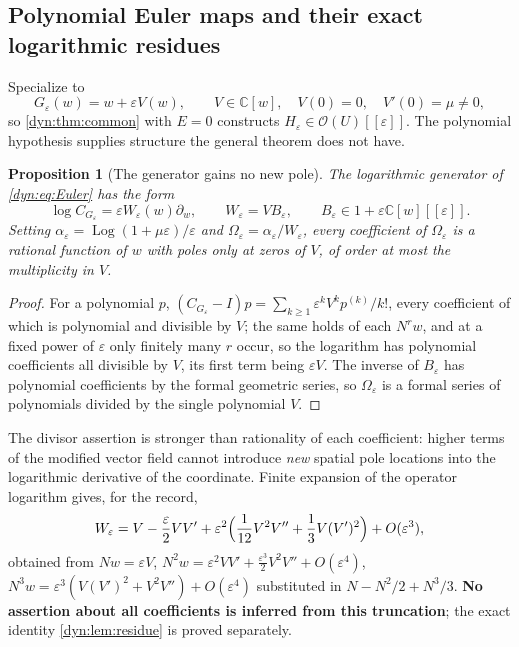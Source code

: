 \documentclass[11pt,letterpaper]{article}
\newtheorem{proposition}[proposition]{Proposition}
\theoremstyle{definition}
\theoremstyle{remark}
\newcommand{\C}{\mathbb C}
\newcommand{\OO}{\mathcal O}
\newcommand{\Log}{\operatorname{Log}}
\newcommand{\eps}{\varepsilon}
\numberwithin{equation}{section}
\begin{document}
\subsection{Polynomial Euler maps and their exact logarithmic residues}
Specialize to
\begin{equation}\label{dyn:eq:Euler}
 G_\eps(w)=w+\eps V(w),\qquad V\in\C[w],\quad V(0)=0,\quad V'(0)=\mu\ne0,
\end{equation}
so \cref{dyn:thm:common} with $E=0$ constructs
$H_\eps\in\OO(U)[[\eps]]$. The polynomial hypothesis supplies structure the
general theorem does not have.

\begin{proposition}[The generator gains no new pole]\label{dyn:prop:factorV}
The logarithmic generator of \eqref{dyn:eq:Euler} has the form
\begin{equation}\label{dyn:eq:Wfactor}
 \log C_{G_\eps}=\eps W_\eps(w)\partial_w,\qquad
 W_\eps=VB_\eps,\qquad B_\eps\in1+\eps\C[w][[\eps]] .
\end{equation}
Setting
$\alpha_\eps=\Log(1+\mu\eps)/\eps$ and
$\Omega_\eps=\alpha_\eps/W_\eps$, every coefficient of $\Omega_\eps$ is a
rational function of $w$ with poles \emph{only} at zeros of $V$, of order
at most the multiplicity in $V$.
\end{proposition}
\begin{proof}
For a polynomial $p$,
$(C_{G_\eps}-I)p=\sum_{k\ge1}\eps^{k}V^{k}p^{(k)}/k!$, every coefficient
of which is polynomial and divisible by $V$; the same holds of each
$N^{r}w$, and at a fixed power of $\eps$ only finitely many $r$ occur, so
the logarithm has polynomial coefficients all divisible by $V$, its first
term being $\eps V$. The inverse of $B_\eps$ has polynomial coefficients by
the formal geometric series, so $\Omega_\eps$ is a formal series of
polynomials divided by the single polynomial $V$.
\end{proof}

The divisor assertion is stronger than rationality of each coefficient:
higher terms of the modified vector field cannot introduce \emph{new}
spatial pole locations into the logarithmic derivative of the coordinate.
Finite expansion of the operator logarithm gives, for the record,
\begin{equation}\label{dyn:eq:modifiedvector}
 W_\eps=V-\frac\eps2VV'
 +\eps^{2}\Bigl(\frac1{12}V^{2}V''+\frac13V(V')^{2}\Bigr)+O(\eps^{3}),
\end{equation}
obtained from $Nw=\eps V$,
$N^{2}w=\eps^{2}VV'+\frac{\eps^{3}}2V^{2}V''+O(\eps^{4})$,
$N^{3}w=\eps^{3}(V(V')^{2}+V^{2}V'')+O(\eps^{4})$ substituted in
$N-N^{2}/2+N^{3}/3$. \textbf{No assertion about all coefficients is
inferred from this truncation}; the exact identity
\cref{dyn:lem:residue} is proved separately.
\end{document}
